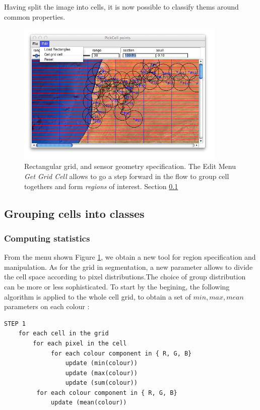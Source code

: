Having split the image into cells, it is now possible to classify thems around common properties.

\begin{figure}[hbtp]
\begin{center} 
\includegraphics[width=10cm]{SenegalGetGridCell.png}
\caption{Rectangular grid, and sensor geometry specification. The Edit Menu {\sl Get Grid Cell} allows to go a step forward in the flow
to group cell togethers and form {\sl regions} of interest. Section \ref{sec:classification}}
\label{fig:SenegalGetGridCell}
\end{center}
\end{figure}

\subsection { Grouping cells  into classes}
\label{sec:classification} 
\subsubsection { Computing statistics}

From the menu shown Figure  \ref{fig:SenegalGetGridCell}, we obtain a new tool for region
specification and manipulation. As for the grid in segmentation, a new parameter allows to divide
the cell space according to pixel distributions.The choice of group distribution  can be more or less sophisticated.
To start by the begining, the following algorithm is applied to the whole cell grid, to obtain a set of $min, max, mean$ parameters
on each colour :

\begin{lstlisting}  
STEP 1
	for each cell in the grid
		for each pixel in the cell 
			 for each colour component in { R, G, B}
				 update (min(colour))
				 update (max(colour))
				 update (sum(colour))
		 for each colour component in { R, G, B}
			 update (mean(colour))
\end{lstlisting}

